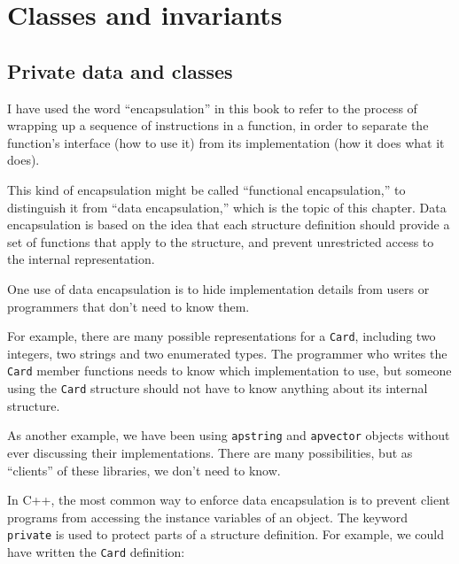 


\chapter{Classes and invariants}
\label{class}

\section{Private data and classes}

I have used the word ``encapsulation'' in this book to refer
to the process of wrapping up a sequence of instructions in
a function, in order to separate the function's interface (how
to use it) from its implementation (how it does what it does).

This kind of encapsulation might be called ``functional
encapsulation,'' to distinguish it from ``data encapsulation,'' which
is the topic of this chapter.  Data encapsulation is based on the idea
that each structure definition should provide a set of functions that
apply to the structure, and prevent unrestricted access to the
internal representation.


One use of data encapsulation is to hide implementation details 
from users or programmers that don't need to know them.

For example, there are many possible representations for a {\tt Card},
including two integers, two strings and two enumerated types.  The
programmer who writes the {\tt Card} member functions needs to
know which implementation to use, but
someone using
the {\tt Card} structure should not have to know anything about
its internal structure.

As another example, we have been using {\tt apstring} and
{\tt apvector} objects without ever discussing their implementations.
There are many possibilities, but as ``clients'' of these
libraries, we don't need to know.


In C++, the most common way to enforce data encapsulation is
to prevent client programs from accessing the instance variables
of an object.  The keyword {\tt private} is used to protect parts
of a structure definition.  For example, we could have written
the {\tt Card} definition:

